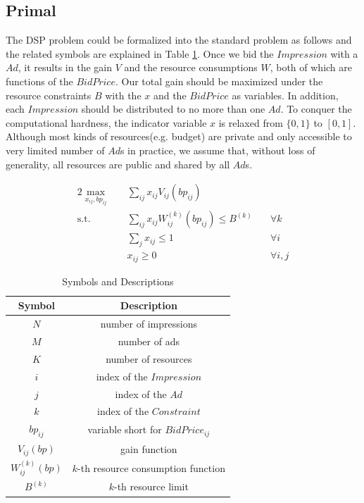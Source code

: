 \documentclass{article}
\newcommand{\sumj}{\sum\limits_j}
\newcommand{\sumij}{\sum\limits_{ij}}
\newcommand{\sx}{x_{ij}}
\newcommand{\sbp}{bp_{ij}}
\newcommand{\sV}{V_{ij}}
\newcommand{\sW}{W_{ij}^{(k)}}
\newcommand{\sB}{B^{(k)}}
\newcommand{\dspresourceconstraint}{\sumij \sx \sW(\sbp) \le \sB}
\newcommand{\assignmentconstraint}{\sumj \sx \le 1}
\begin{document}
\subsection{Primal} \label{Primal}

The DSP problem could be formalized into the standard problem as follows and the related symbols are explained in Table \ref{TableSymbols}.
Once we bid the $Impression$ with a $Ad$, it results in the gain $V$ and the resource consumptions $W$, both of which are functions of the $BidPrice$.
Our total gain should be maximized under the resource constraints $B$ with the $x$ and the $BidPrice$ as variables.
In addition, each $Impression$ should be distributed to no more than one $Ad$.
To conquer the computational hardness, the indicator variable $x$ is relaxed from $\{0, 1\}$ to $[0, 1]$.
Although most kinds of resources(e.g. budget) are private and only accessible to very limited number of $Ad$s in practice,
    we assume that, without loss of generality, all resources are public and shared by all $Ad$s.

\begin{alignat}{2}
    \max\limits_{\sx, \sbp} \quad & \sumij \sx \sV(\sbp) \quad    & {} \\
    \mbox{s.t.} \quad             & \dspresourceconstraint \quad  & \forall k \\
    \quad                         & \assignmentconstraint \quad   & \forall i \\
    \quad                         & \sx \ge 0 \quad               & \forall i,j
\end{alignat}

\begin{table}[h]
\caption{Symbols and Descriptions\label{TableSymbols}}
\begin{center}
\begin{tabular}{c|c}
\textbf{Symbol} & \textbf{Description} \\
\hline
\hline
$N$             & number of impressions \\
$M$             & number of ads \\
$K$             & number of resources \\
$i$             & index of the $Impression$ \\
$j$             & index of the $Ad$ \\
$k$             & index of the $Constraint$ \\
$\sbp$          & variable short for $BidPrice_{ij}$ \\
$\sV(bp)$       & gain function \\
$\sW(bp)$       & $k$-th resource consumption function \\
$\sB$           & $k$-th resource limit \\
\end{tabular}
\end{center}
\end{table}
\end{document}
